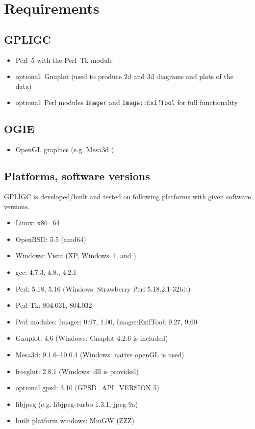 \section{Requirements}
\label{requirements}

\subsection*{GPLIGC}

\begin{itemize}
\item Perl~5 with the Perl~Tk module \cite{perl,perltk}
\item {\scriptsize optional:} Gnuplot \cite{gnuplot} (used to produce 2d and 3d diagrams and plots of the data)
\item {\scriptsize optional:} Perl modules \texttt{Imager} \cite{imager} and \texttt{Image::ExifTool} \cite{exiftool} for full functionality
\end{itemize}


\subsection*{OGIE}

\begin{itemize}
\item OpenGL graphics (e.g. Mesa3d \cite{mesa})
\end{itemize}


\subsection*{Platforms, software versions}
GPLIGC is developed/built and tested on following platforms with given software versions.

\begin{itemize}
\item Linux: x86\_64
\item OpenBSD: 5.5 (amd64)
\item Windows: Vista (XP, Windows~7, and )
\item gcc: 4.7.3, %
4.8., %
4.2.1 %
\item Perl: 5.18, %
5.16 %
(Windows: Strawberry Perl 5.18.2.1-32bit)
\item Perl Tk: 804.031, 804.032
\item Perl modules: Imager: 0.97, 1.00, %
Image::ExifTool: 9.27, 9.60
\item Gnuplot: 4.6 (Windows: Gnuplot-4.2.6 is included)
\item Mesa3d: 9.1.6--10.0.4 (Windows: native openGL is used)
\item freeglut: 2.8.1 (Windows: dll is provided)
\item {\scriptsize optional} gpsd: 3.10 (GPSD\_API\_VERSION 5)
\item libjpeg (e.g. libjpeg-turbo 1.3.1, jpeg 9a)
\item built platform windows: MinGW (ZZZ)
\end{itemize}


